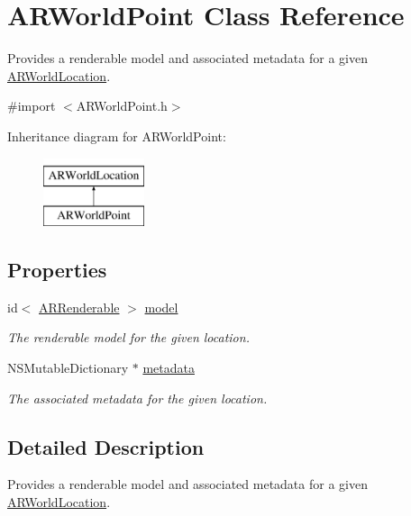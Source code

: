 \hypertarget{interface_a_r_world_point}{
\section{ARWorldPoint Class Reference}
\label{interface_a_r_world_point}
}


Provides a renderable model and associated metadata for a given \hyperlink{interface_a_r_world_location}{ARWorldLocation}.  




{\ttfamily \#import $<$ARWorldPoint.h$>$}

Inheritance diagram for ARWorldPoint:\begin{figure}[H]
\begin{center}
\leavevmode
\includegraphics[height=2.000000cm]{interface_a_r_world_point}
\end{center}
\end{figure}
\subsection*{Properties}
\begin{DoxyCompactItemize}
\item 
\hypertarget{interface_a_r_world_point_a31c4c5837e58a5d02fc59c370c9138b9}{
id$<$ \hyperlink{protocol_a_r_renderable-p}{ARRenderable} $>$ \hyperlink{interface_a_r_world_point_a31c4c5837e58a5d02fc59c370c9138b9}{model}}
\label{interface_a_r_world_point_a31c4c5837e58a5d02fc59c370c9138b9}

\begin{DoxyCompactList}\small\item\em The renderable model for the given location. \end{DoxyCompactList}\item 
NSMutableDictionary $\ast$ \hyperlink{interface_a_r_world_point_a25146859c4e3ab1a0bf9ba74e3fdb763}{metadata}
\begin{DoxyCompactList}\small\item\em The associated metadata for the given location. \end{DoxyCompactList}\end{DoxyCompactItemize}


\subsection{Detailed Description}
Provides a renderable model and associated metadata for a given \hyperlink{interface_a_r_world_location}{ARWorldLocation}. 

